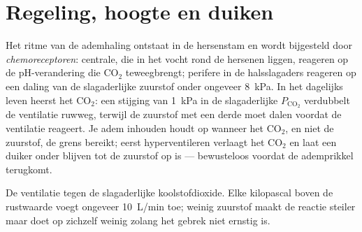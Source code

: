 \section{Regeling, hoogte en duiken}

\begin{proposition}\label{prop:b1:gas-exchange:control}
Het ritme van de ademhaling ontstaat in de hersenstam en wordt bijgesteld door
\emph{chemoreceptoren}: centrale, die in het vocht rond de hersenen liggen,
reageren op de pH-verandering die $\mathrm{CO_2}$ teweegbrengt; perifere in de
halsslagaders reageren op een daling van de slagaderlijke zuurstof onder ongeveer
\qty{8}{kPa}. In het dagelijks leven heerst het $\mathrm{CO_2}$: een stijging van
\qty{1}{kPa} in de slagaderlijke $P_{\mathrm{CO_2}}$ verdubbelt de ventilatie
ruwweg, terwijl de zuurstof met een derde moet dalen voordat de ventilatie
reageert. Je adem inhouden houdt op wanneer het $\mathrm{CO_2}$, en niet de
zuurstof, de grens bereikt; eerst hyperventileren verlaagt het $\mathrm{CO_2}$ en
laat een duiker onder blijven tot de zuurstof op is --- bewusteloos voordat de
ademprikkel terugkomt.
\end{proposition}

\begin{omfigure}

{\small De ventilatie tegen de slagaderlijke koolstofdioxide. Elke kilopascal boven
de rustwaarde voegt ongeveer \qty{10}{L/min} toe; weinig zuurstof maakt de reactie
steiler maar doet op zichzelf weinig zolang het gebrek niet ernstig is.}
\end{omfigure}

